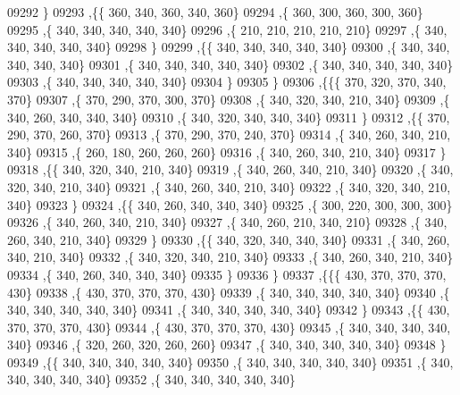 \begin{DoxyCode}
09292     \}
09293    ,\{\{   360,   340,   360,   340,   360\}
09294     ,\{   360,   300,   360,   300,   360\}
09295     ,\{   340,   340,   340,   340,   340\}
09296     ,\{   210,   210,   210,   210,   210\}
09297     ,\{   340,   340,   340,   340,   340\}
09298     \}
09299    ,\{\{   340,   340,   340,   340,   340\}
09300     ,\{   340,   340,   340,   340,   340\}
09301     ,\{   340,   340,   340,   340,   340\}
09302     ,\{   340,   340,   340,   340,   340\}
09303     ,\{   340,   340,   340,   340,   340\}
09304     \}
09305    \}
09306   ,\{\{\{   370,   320,   370,   340,   370\}
09307     ,\{   370,   290,   370,   300,   370\}
09308     ,\{   340,   320,   340,   210,   340\}
09309     ,\{   340,   260,   340,   340,   340\}
09310     ,\{   340,   320,   340,   340,   340\}
09311     \}
09312    ,\{\{   370,   290,   370,   260,   370\}
09313     ,\{   370,   290,   370,   240,   370\}
09314     ,\{   340,   260,   340,   210,   340\}
09315     ,\{   260,   180,   260,   260,   260\}
09316     ,\{   340,   260,   340,   210,   340\}
09317     \}
09318    ,\{\{   340,   320,   340,   210,   340\}
09319     ,\{   340,   260,   340,   210,   340\}
09320     ,\{   340,   320,   340,   210,   340\}
09321     ,\{   340,   260,   340,   210,   340\}
09322     ,\{   340,   320,   340,   210,   340\}
09323     \}
09324    ,\{\{   340,   260,   340,   340,   340\}
09325     ,\{   300,   220,   300,   300,   300\}
09326     ,\{   340,   260,   340,   210,   340\}
09327     ,\{   340,   260,   210,   340,   210\}
09328     ,\{   340,   260,   340,   210,   340\}
09329     \}
09330    ,\{\{   340,   320,   340,   340,   340\}
09331     ,\{   340,   260,   340,   210,   340\}
09332     ,\{   340,   320,   340,   210,   340\}
09333     ,\{   340,   260,   340,   210,   340\}
09334     ,\{   340,   260,   340,   340,   340\}
09335     \}
09336    \}
09337   ,\{\{\{   430,   370,   370,   370,   430\}
09338     ,\{   430,   370,   370,   370,   430\}
09339     ,\{   340,   340,   340,   340,   340\}
09340     ,\{   340,   340,   340,   340,   340\}
09341     ,\{   340,   340,   340,   340,   340\}
09342     \}
09343    ,\{\{   430,   370,   370,   370,   430\}
09344     ,\{   430,   370,   370,   370,   430\}
09345     ,\{   340,   340,   340,   340,   340\}
09346     ,\{   320,   260,   320,   260,   260\}
09347     ,\{   340,   340,   340,   340,   340\}
09348     \}
09349    ,\{\{   340,   340,   340,   340,   340\}
09350     ,\{   340,   340,   340,   340,   340\}
09351     ,\{   340,   340,   340,   340,   340\}
09352     ,\{   340,   340,   340,   340,   340\}

\end{DoxyCode}
